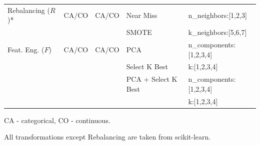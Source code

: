 \begin{table}[!t]
\begin{threeparttable}
\begin{tabular}{@{}p{30mm}lll>{\ttfamily}l@{}}
Rebalancing ($R$)* &CA/CO  & CA/CO & Near Miss & n\_neighbors:[1,2,3]\\ \cmidrule[.05em]{4-5}
&  &  & SMOTE & k\_neighbors:[5,6,7]\\	\cmidrule[.1em]{1-5}

Feat. Eng. ($F$) & CA/CO & CA/CO & PCA & n\_components:[1,2,3,4]\\ \cmidrule[.05em]{4-5}
&  &  & Select K Best & k:[1,2,3,4]\\ \cmidrule[.05em]{4-5}
&  &  & PCA + Select K Best  & n\_components:[1,2,3,4]
\\ \cmidrule[.05em]{4-5} & & & & k:[1,2,3,4]\\	\bottomrule%
\end{tabular}
\begin{tablenotes}
\footnotesize
\item CA - categorical, CO - continuous.
\item *All transformations except Rebalancing are taken from scikit-learn.
\end{tablenotes}
\end{threeparttable}
\label{effective-tbl:transformations}
\end{table}

